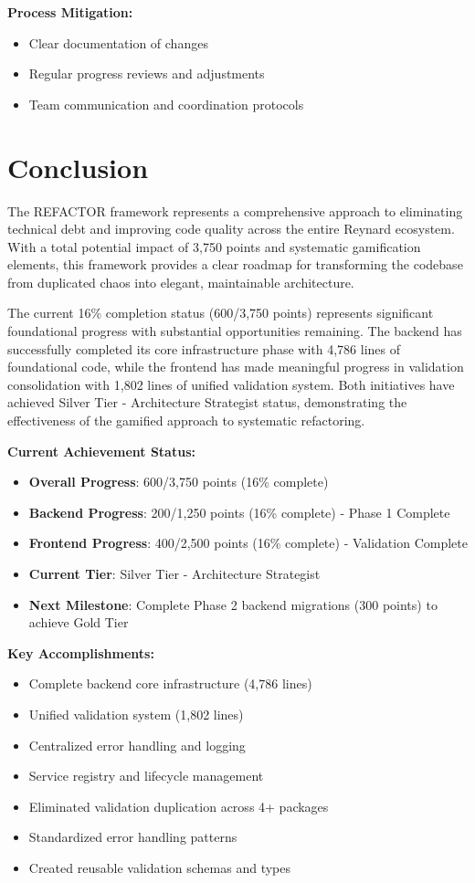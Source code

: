 \documentclass[10pt]{article}
\begin{document}
\textbf{Process Mitigation:}
\begin{itemize}
    \item Clear documentation of changes
    \item Regular progress reviews and adjustments
    \item Team communication and coordination protocols
\end{itemize}

\section{Conclusion}

The REFACTOR framework represents a comprehensive approach to eliminating technical debt and improving code quality across the entire Reynard ecosystem. With a total potential impact of 3,750 points and systematic gamification elements, this framework provides a clear roadmap for transforming the codebase from duplicated chaos into elegant, maintainable architecture.

The current 16\% completion status (600/3,750 points) represents significant foundational progress with substantial opportunities remaining. The backend has successfully completed its core infrastructure phase with 4,786 lines of foundational code, while the frontend has made meaningful progress in validation consolidation with 1,802 lines of unified validation system. Both initiatives have achieved Silver Tier - Architecture Strategist status, demonstrating the effectiveness of the gamified approach to systematic refactoring.

\textbf{Current Achievement Status:}
\begin{itemize}
    \item \textbf{Overall Progress}: 600/3,750 points (16\% complete)
    \item \textbf{Backend Progress}: 200/1,250 points (16\% complete) - Phase 1 Complete
    \item \textbf{Frontend Progress}: 400/2,500 points (16\% complete) - Validation Complete
    \item \textbf{Current Tier}: Silver Tier - Architecture Strategist
    \item \textbf{Next Milestone}: Complete Phase 2 backend migrations (300 points) to achieve Gold Tier
\end{itemize}

\textbf{Key Accomplishments:}
\begin{itemize}
    \item Complete backend core infrastructure (4,786 lines)
    \item Unified validation system (1,802 lines)
    \item Centralized error handling and logging
    \item Service registry and lifecycle management
    \item Eliminated validation duplication across 4+ packages
    \item Standardized error handling patterns
    \item Created reusable validation schemas and types
\end{itemize}
\end{document}
